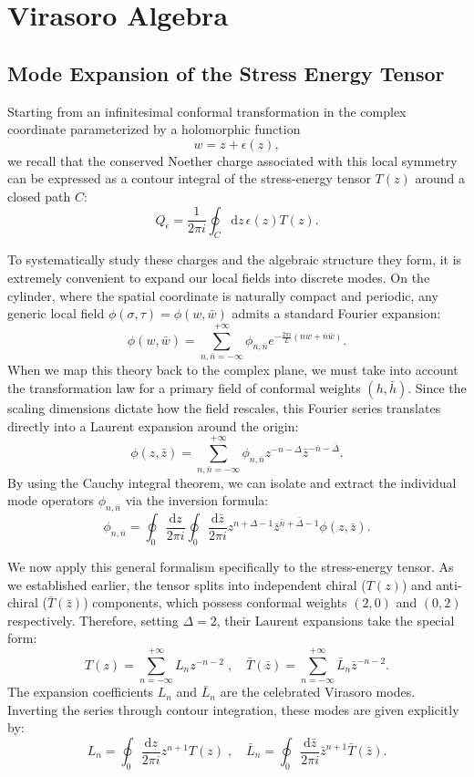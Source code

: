 \section{Virasoro Algebra}

\subsection{Mode Expansion of the Stress Energy Tensor}

Starting from an infinitesimal conformal transformation in the complex coordinate parameterized by a holomorphic function
\[
    w = z + \epsilon(z),
\]
we recall that the conserved Noether charge associated with this local symmetry can be expressed as a contour integral of the stress-energy tensor \(T(z)\) around a closed path \(C\):
\[
    Q_{\epsilon} = \frac{1}{2\pi i} \oint_C \mathrm{d}z \, \epsilon(z) T(z).
\]

To systematically study these charges and the algebraic structure they form, it is extremely convenient to expand our local fields into discrete modes. On the cylinder, where the spatial coordinate is naturally compact and periodic, any generic local field \(\phi(\sigma, \tau) = \phi(w, \bar{w})\) admits a standard Fourier expansion:
\[
    \phi(w, \bar{w}) = \sum_{n, \bar{n} = -\infty}^{+\infty} \phi_{n, \bar{n}} e^{-\frac{2\pi i}{L}(n w + \bar{n} \bar{w})}.
\]
When we map this theory back to the complex plane, we must take into account the transformation law for a primary field of conformal weights \((h, \bar{h})\). Since the scaling dimensions dictate how the field rescales, this Fourier series translates directly into a Laurent expansion around the origin:
\[
    \phi(z, \bar{z}) = \sum_{n, \bar{n} = -\infty}^{+\infty} \phi_{n, \bar{n}} z^{-n-\Delta} \bar{z}^{-\bar{n}-\bar{\Delta}}.
\]
By using the Cauchy integral theorem, we can isolate and extract the individual mode operators \(\phi_{n, \bar{n}}\) via the inversion formula:
\[
    \phi_{n, \bar{n}} = \oint_0 \frac{\mathrm{d}z}{2\pi i} \oint_0 \frac{\mathrm{d}\bar{z}}{2\pi i} z^{n+\Delta-1} \bar{z}^{\bar{n}+\bar{\Delta}-1} \phi(z, \bar{z}).
\]

We now apply this general formalism specifically to the stress-energy tensor. As we established earlier, the tensor splits into independent chiral (\(T(z)\)) and anti-chiral (\(\bar{T}(\bar{z})\)) components, which possess conformal weights \((2,0)\) and \((0,2)\) respectively. Therefore, setting \(\Delta = 2\), their Laurent expansions take the special form:
\[
    T(z) = \sum_{n=-\infty}^{+\infty} L_n z^{-n-2} \;, \quad \bar{T}(\bar{z}) = \sum_{n=-\infty}^{+\infty} \bar{L}_n \bar{z}^{-n-2}.
\]
The expansion coefficients \(L_n\) and \(\bar{L}_n\) are the celebrated Virasoro modes. Inverting the series through contour integration, these modes are given explicitly by:
\[
    L_n = \oint_0 \frac{\mathrm{d}z}{2\pi i} z^{n+1} T(z) \;, \quad \bar{L}_n = \oint_0 \frac{\mathrm{d}\bar{z}}{2\pi i} \bar{z}^{n+1} \bar{T}(\bar{z}).
\]

